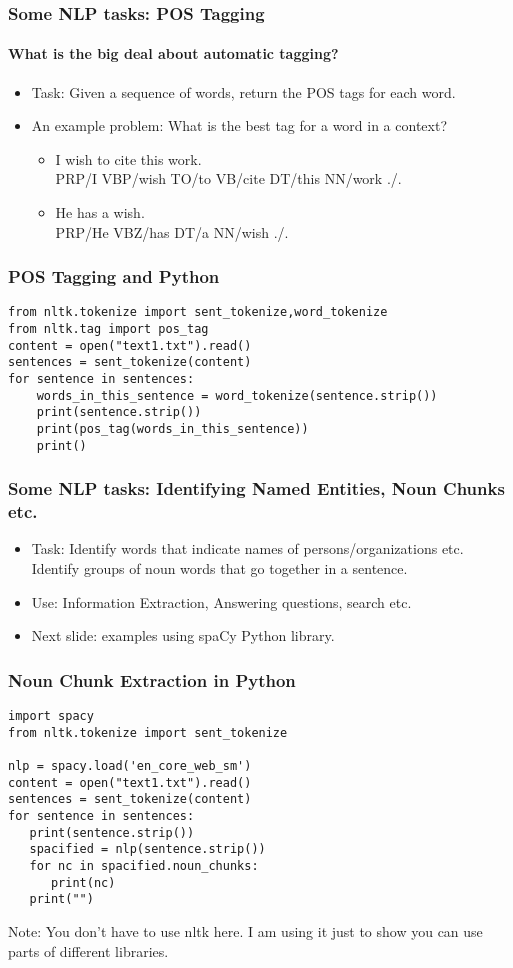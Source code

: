 \documentclass{beamer}
\begin{document}
\begin{frame}
\frametitle{Some NLP tasks: POS Tagging}
\framesubtitle{What is the big deal about automatic tagging?}
\begin{itemize}
\item Task: Given a sequence of words, return the POS tags for each word.
\item An example problem: What is the best tag for a word in a context?
\begin{itemize}
\item I wish to cite this work. 
\\ PRP/I  VBP/wish  TO/to  VB/cite  DT/this  NN/work ./.
\item He has a wish.
\\ PRP/He  VBZ/has  DT/a  NN/wish ./. 
\end{itemize}
\end{itemize}
\end{frame}

\begin{frame}[fragile]
\small
\frametitle{POS Tagging and Python}
\begin{verbatim}
from nltk.tokenize import sent_tokenize,word_tokenize
from nltk.tag import pos_tag
content = open("text1.txt").read()
sentences = sent_tokenize(content)
for sentence in sentences:
    words_in_this_sentence = word_tokenize(sentence.strip())
    print(sentence.strip())
    print(pos_tag(words_in_this_sentence))
    print()
\end{verbatim}
\end{frame}

\begin{frame}
\frametitle{Some NLP tasks: Identifying Named Entities, Noun Chunks etc.}
\begin{itemize}
\item Task: Identify words that indicate names of persons/organizations etc. Identify groups of noun words that go together in a sentence. 
\item Use: Information Extraction, Answering questions, search etc.
\item Next slide: examples using spaCy Python library. 
\end{itemize}
\end{frame}

\begin{frame}[fragile]
\frametitle{Noun Chunk Extraction in Python}
\small
\begin{verbatim}
import spacy
from nltk.tokenize import sent_tokenize

nlp = spacy.load('en_core_web_sm')
content = open("text1.txt").read()
sentences = sent_tokenize(content)
for sentence in sentences:
   print(sentence.strip())
   spacified = nlp(sentence.strip())
   for nc in spacified.noun_chunks:
      print(nc)
   print("")
\end{verbatim}
Note: You don't have to use nltk here. I am using it just to show you can use parts of different libraries. 
\end{frame}
\end{document}
